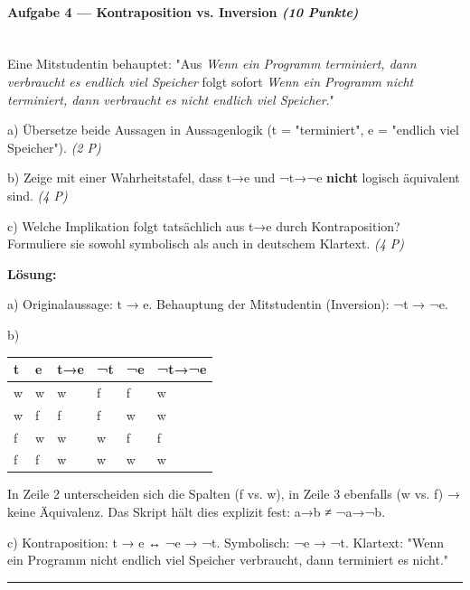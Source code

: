 \documentclass[11pt, a4paper]{article}
\begin{document}
\paragraph{Aufgabe 4 — Kontraposition vs. Inversion \textit{(10 Punkte)}}\mbox{}\\[2pt]

Eine Mitstudentin behauptet: "Aus \textit{Wenn ein Programm terminiert, dann verbraucht es endlich viel Speicher} folgt sofort \textit{Wenn ein Programm nicht terminiert, dann verbraucht es nicht endlich viel Speicher}."


a) Übersetze beide Aussagen in Aussagenlogik (t = "terminiert", e = "endlich viel Speicher"). \textit{(2 P)}


b) Zeige mit einer Wahrheitstafel, dass t→e und ¬t→¬e \textbf{nicht} logisch äquivalent sind. \textit{(4 P)}


c) Welche Implikation folgt tatsächlich aus t→e durch Kontraposition? Formuliere sie sowohl symbolisch als auch in deutschem Klartext. \textit{(4 P)}


\textbf{Lösung:}


a) Originalaussage: t → e. Behauptung der Mitstudentin (Inversion): ¬t → ¬e.


b)



{\small
\begin{tabularx}{\linewidth}{XXXXXX}
\hline
\rowcolor{tableheadbg}
{\color{white}\textbf{t}} & {\color{white}\textbf{e}} & {\color{white}\textbf{t→e}} & {\color{white}\textbf{¬t}} & {\color{white}\textbf{¬e}} & {\color{white}\textbf{¬t→¬e}} \\[2pt]
\hline
\endhead
\hline
\endfoot
w & w & w & f & f & w \\
w & f & f & f & w & w \\
f & w & w & w & f & f \\
f & f & w & w & w & w \\
\end{tabularx}
}


In Zeile 2 unterscheiden sich die Spalten (f vs. w), in Zeile 3 ebenfalls (w vs. f) → keine Äquivalenz. Das Skript hält dies explizit fest: a→b ≠ ¬a→¬b.


c) Kontraposition: t → e ↔ ¬e → ¬t. Symbolisch: ¬e → ¬t. Klartext: "Wenn ein Programm nicht endlich viel Speicher verbraucht, dann terminiert es nicht."



\noindent\textcolor{rulegray}{\rule{\linewidth}{0.4pt}}
\end{document}
